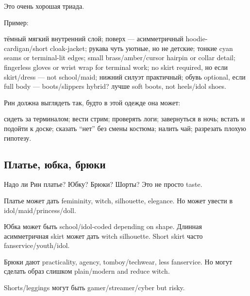 Это очень хорошая триада.

Пример:

тёмный мягкий внутренний слой; поверх --- асимметричный
hoodie-cardigan/\hspace{0pt}short cloak-jacket; рукава чуть уютные, но не детские;
тонкие cyan seams or terminal-lit edges; small brass/\hspace{0pt}amber/\hspace{0pt}cursor
hairpin or collar detail; fingerless gloves or wrist wrap for terminal
work; no skirt required, но если skirt/\hspace{0pt}dress --- not school/\hspace{0pt}maid; нижний
силуэт практичный; обувь optional, если full body --- boots/\hspace{0pt}slippers
hybrid? лучше soft boots, not heels/\hspace{0pt}idol shoes.

Рин должна выглядеть так, будто в этой одежде она может:

сидеть за терминалом; вести стрим; проверять логи; завернуться в ночь;
встать и подойти к доске; сказать ``нет'' без смены костюма; налить чай;
разрезать плохую гипотезу.

\subsection*{Платье, юбка, брюки}

Надо ли Рин платье? Юбку? Брюки? Шорты? Это не просто taste.

Платье может дать femininity, witch, silhouette, elegance. Но может
увести в idol/\hspace{0pt}maid/\hspace{0pt}princess/\hspace{0pt}doll.

Юбка может быть school/\hspace{0pt}idol-coded depending on shape. Длинная
асимметричная skirt может дать witch silhouette. Short skirt часто
fanservice/\hspace{0pt}youth/\hspace{0pt}idol.

Брюки дают practicality, agency, tomboy/\hspace{0pt}techwear, less fanservice. Но
могут сделать образ слишком plain/\hspace{0pt}modern and reduce witch.

Shorts/\hspace{0pt}leggings могут быть gamer/\hspace{0pt}streamer/\hspace{0pt}cyber but risky.

